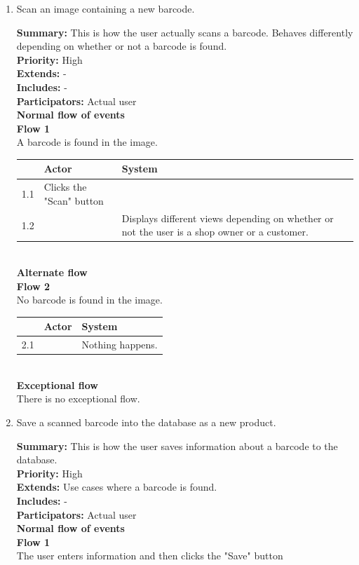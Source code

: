 \documentclass{report}
\begin{document}
\begin{enumerate}

  \item Scan an image containing a new barcode. \

    \textbf{Summary:} This is how the user actually scans a barcode. Behaves differently depending on whether or not a barcode is found. \\
    \textbf{Priority:} High \\
    \textbf{Extends:} - \\
    \textbf{Includes:} - \\
    \textbf{Participators:} Actual user \\
    \textbf{Normal flow of events} \\
    \textbf{Flow 1} \\ A barcode is found in the image. \\

    \begin{tabular}{ | l | p{4cm} | p{4cm} |}
    \hline
      & Actor & System \\ \hline
    1.1 & Clicks the "Scan" button & \\ \hline
    1.2 & & Displays different views depending on whether or not the user is a shop owner or a customer. \\
    \hline
    \end{tabular} \\

    \textbf{Alternate flow} \\
    \textbf{Flow 2} \\ No barcode is found in the image. \\

    \begin{tabular}{ | l | p{4cm} | p{4cm} |}
    \hline
      & Actor & System \\ \hline
    2.1 & & Nothing happens. \\
    \hline
    \end{tabular} \\

    \textbf{Exceptional flow} \\ There is no exceptional flow.

\pagebreak

  \item Save a scanned barcode into the database as a new product. \

    \textbf{Summary:} This is how the user saves information about a barcode to the database. \\
    \textbf{Priority:} High \\
    \textbf{Extends:} Use cases where a barcode is found. \\
    \textbf{Includes:} - \\
    \textbf{Participators:} Actual user \\
    \textbf{Normal flow of events} \\
    \textbf{Flow 1} \\ The user enters information and then clicks the "Save" button \\


\end{enumerate}
\end{document}
